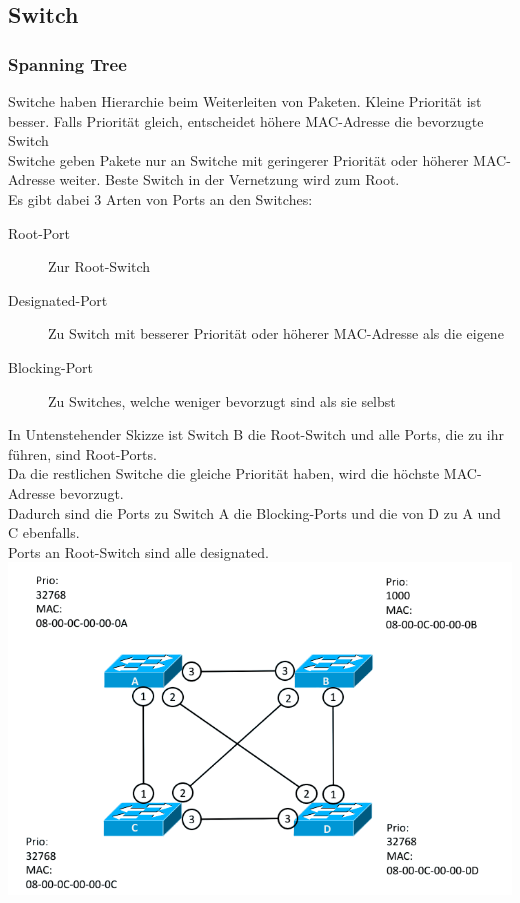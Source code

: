 \documentclass[12pt,a4paper]{article}
\begin{document}
		\subsection{Switch}
			\subsubsection{Spanning Tree}
				Switche haben Hierarchie beim Weiterleiten von Paketen. Kleine Priorität ist besser. Falls Priorität gleich, entscheidet höhere MAC-Adresse die bevorzugte Switch\\
				Switche geben Pakete nur an Switche mit geringerer Priorität oder höherer MAC-Adresse weiter. Beste Switch in der Vernetzung wird zum Root.\\
				Es gibt dabei 3 Arten von Ports an den Switches:
				\begin{description}
					\item[Root-Port] Zur Root-Switch
					\item[Designated-Port] Zu Switch mit besserer Priorität oder höherer MAC-Adresse als die eigene
					\item[Blocking-Port] Zu Switches, welche weniger bevorzugt sind als sie selbst 
				\end{description}
				In Untenstehender Skizze ist Switch B die Root-Switch und alle Ports, die zu ihr führen, sind Root-Ports.\\
				Da die restlichen Switche die gleiche Priorität haben, wird die höchste MAC-Adresse bevorzugt. \\
				Dadurch sind die Ports zu Switch A die Blocking-Ports und die von D zu A und C ebenfalls. \\
				Ports an Root-Switch sind alle designated.\\
				\includegraphics[width=\textwidth]{Bilder/RouterVermascht.png}
\end{document}
